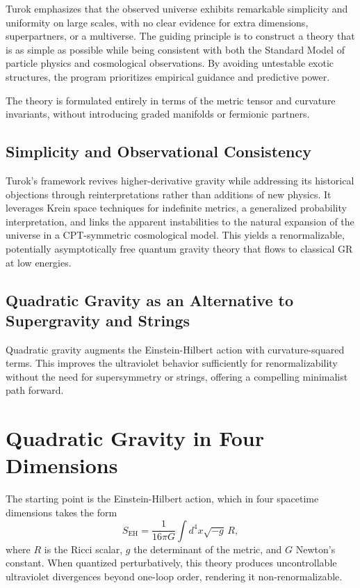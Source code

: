 \documentclass{article}
\begin{document}
Turok emphasizes that the observed universe exhibits remarkable simplicity and uniformity on large scales, with no clear evidence for extra dimensions, superpartners, or a multiverse. The guiding principle is to construct a theory that is as simple as possible while being consistent with both the Standard Model of particle physics and cosmological observations. By avoiding untestable exotic structures, the program prioritizes empirical guidance and predictive power.

The theory is formulated entirely in terms of the metric tensor and curvature invariants, without introducing graded manifolds or fermionic partners.

\subsection{Simplicity and Observational Consistency}

Turok's framework revives higher-derivative gravity while addressing its historical objections through reinterpretations rather than additions of new physics. It leverages Krein space techniques for indefinite metrics, a generalized probability interpretation, and links the apparent instabilities to the natural expansion of the universe in a CPT-symmetric cosmological model. This yields a renormalizable, potentially asymptotically free quantum gravity theory that flows to classical GR at low energies.

\subsection{Quadratic Gravity as an Alternative to Supergravity and Strings}

Quadratic gravity augments the Einstein-Hilbert action with curvature-squared terms. This improves the ultraviolet behavior sufficiently for renormalizability without the need for supersymmetry or strings, offering a compelling minimalist path forward.

\section{Quadratic Gravity in Four Dimensions}
\label{sec:quadratic}

The starting point is the Einstein-Hilbert action, which in four spacetime dimensions takes the form
\[
S_{\text{EH}} = \frac{1}{16\pi G} \int d^4x \sqrt{-g} \, R,
\]
where $R$ is the Ricci scalar, $g$ the determinant of the metric, and $G$ Newton's constant. When quantized perturbatively, this theory produces uncontrollable ultraviolet divergences beyond one-loop order, rendering it non-renormalizable.
\end{document}
